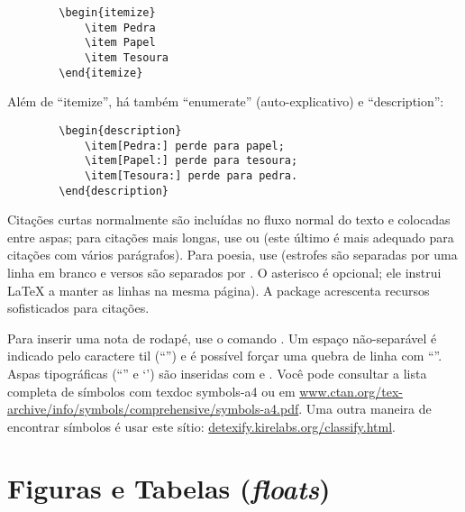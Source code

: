 \begin{verbatim}
        \begin{itemize}
            \item Pedra
            \item Papel
            \item Tesoura
        \end{itemize}
\end{verbatim}

Além de ``itemize'', há também ``enumerate'' (auto-explicativo) e ``description'':

\begin{verbatim}
        \begin{description}
            \item[Pedra:] perde para papel;
            \item[Papel:] perde para tesoura;
            \item[Tesoura:] perde para pedra.
        \end{description}
\end{verbatim}

Citações curtas normalmente são incluídas no fluxo normal do texto e colocadas
entre aspas; para citações mais longas, use  ou
 (este último é mais adequado para citações com
vários parágrafos). Para poesia, use  (estrofes são separadas por
uma linha em branco e versos são separados por \cmd{\sla\sla{}*}. O asterisco
é opcional; ele instrui \LaTeX{} a manter as linhas na mesma página). A package
 acrescenta recursos sofisticados para citações.

Para inserir uma nota de rodapé, use o comando
. Um espaço
não-separável é indicado pelo caractere til (``\cmd{\textasciitilde{}}'')
e é possível forçar uma quebra de linha com ``\cmd{\sla\sla{}}''. Aspas
tipográficas (``'' e `') são inseridas com
\texttt{\textasciigrave\textasciigrave\textquotesingle\textquotesingle} e
\texttt{\textasciigrave\textquotesingle}. Você pode consultar a lista completa de
símbolos com \textsf{texdoc symbols-a4} ou em \url{www.ctan.org/tex-archive/info/symbols/comprehensive/symbols-a4.pdf}.
Uma outra maneira de encontrar símbolos é usar este sítio: \url{detexify.kirelabs.org/classify.html}.

\section{Figuras e Tabelas (\emph{floats})}
\label{sec:floats}

